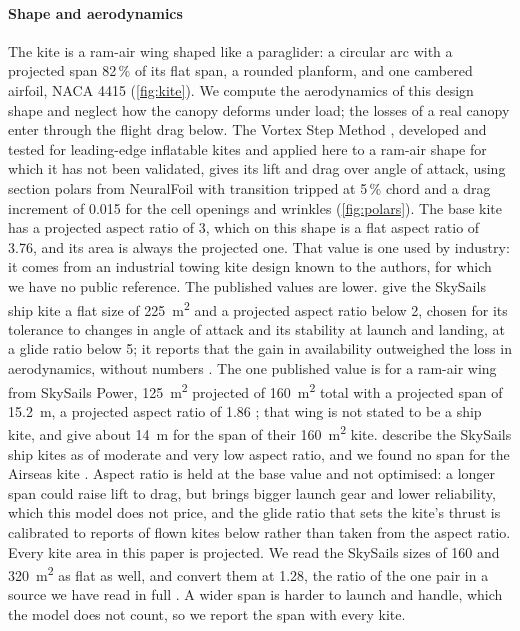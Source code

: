 \paragraph{Shape and aerodynamics} The kite is a ram-air wing shaped like a paraglider: a circular arc with a projected span 82\,\% of its flat span, a rounded planform, and one cambered airfoil, NACA 4415 (\cref{fig:kite}). We compute the aerodynamics of this design shape and neglect how the canopy deforms under load; the losses of a real canopy enter through the flight drag below. The Vortex Step Method \citep{cayon2023}, developed and tested for leading-edge inflatable kites and applied here to a ram-air shape for which it has not been validated, gives its lift and drag over angle of attack, using section polars from NeuralFoil \citep{sharpe2025} with transition tripped at 5\,\% chord and a drag increment of 0.015 for the cell openings and wrinkles (\cref{fig:polars}). The base kite has a projected aspect ratio of 3, which on this shape is a flat aspect ratio of 3.76, and its area is always the projected one. That value is one used by industry: it comes from an industrial towing kite design known to the authors, for which we have no public reference. The published values are lower. \citet{paulig2013} give the SkySails ship kite a flat size of \SI{225}{m^2} and a projected aspect ratio below 2, chosen for its tolerance to changes in angle of attack and its stability at launch and landing, at a glide ratio below 5; it reports that the gain in availability outweighed the loss in aerodynamics, without numbers \citep{paulig2013}. The one published value is for a ram-air wing from SkySails Power, \SI{125}{m^2} projected of \SI{160}{m^2} total with a projected span of \SI{15.2}{m}, a projected aspect ratio of 1.86 \citep{folkersma2020}; that wing is not stated to be a ship kite, and \citet{paulig2013} give about \SI{14}{m} for the span of their \SI{160}{m^2} kite. \citet{penloup2021} describe the SkySails ship kites as of moderate and very low aspect ratio, and we found no span for the Airseas kite \citep{airseas_seawing_web}. Aspect ratio is held at the base value and not optimised: a longer span could raise lift to drag, but brings bigger launch gear and lower reliability, which this model does not price, and the glide ratio that sets the kite's thrust is calibrated to reports of flown kites below rather than taken from the aspect ratio.  Every kite area in this paper is projected. We read the SkySails sizes of 160 and \SI{320}{m^2} as flat as well, and convert them at 1.28, the ratio of the one pair in a source we have read in full \citep{folkersma2020}. A wider span is harder to launch and handle, which the model does not count, so we report the span with every kite.

